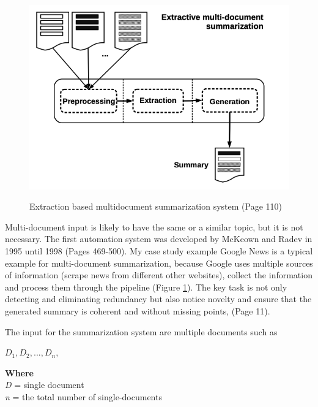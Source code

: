 \begin{figure}
	\begin{center}
		\includegraphics[width=4.5in]{photos/multidoc}\\
		\caption{Extraction based multidocument summarization system \cite{juan} (Page 110)}\label{multi}
	\end{center}
\end{figure}

Multi-document input is likely to have the same or a similar topic, but it is not necessary. The first automation system was developed by McKeown and Radev in 1995 until 1998 \cite{radev-mckeown-1998-generating} (Pages 469-500). My case study example Google News is a typical example for multi-document summarization, because Google uses multiple sources of information (scrape news from different other websites), collect the information and process them through the pipeline (Figure \ref{multi}). The key task is not only detecting and eliminating redundancy but also notice novelty and ensure that the generated summary is coherent and without missing points, \cite{Das07asurvey} (Page 11).
 
The input for the summarization system are multiple documents such as 

\begin{tcolorbox}
	\begin{center}
		\(D_{1}, D_{2},..., D_{n}\),
	\end{center}
\end{tcolorbox}

\begin{tcolorbox}
	\textbf{Where} \\
	\textit{D} = single document \\ 
	\textit{n} = the total number of single-documents
\end{tcolorbox}

